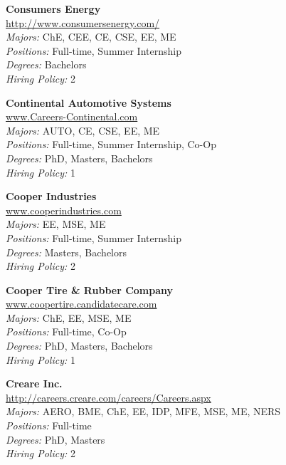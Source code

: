 \documentclass{article}
\begin{document}
\begin{center}
\begin{multicols}{3}
\begin{minipage}{.9\columnwidth}{\Large\bf Consumers Energy }\\
	\url{http://www.consumersenergy.com/}\\
	\emph{Majors:} ChE, CEE, CE, CSE, EE, ME\\
	\emph{Positions:} Full-time, Summer Internship\\
	\emph{Degrees:} Bachelors\\
	\emph{Hiring Policy:} 2\\
\end{minipage}
 
\begin{minipage}{.9\columnwidth}{\Large\bf Continental Automotive Systems }\\
	\url{www.Careers-Continental.com}\\
	\emph{Majors:} AUTO, CE, CSE, EE, ME\\
	\emph{Positions:} Full-time, Summer Internship, Co-Op\\
	\emph{Degrees:} PhD, Masters, Bachelors\\
	\emph{Hiring Policy:} 1\\
\end{minipage}
 
\begin{minipage}{.9\columnwidth}{\Large\bf Cooper Industries }\\
	\url{www.cooperindustries.com}\\
	\emph{Majors:} EE, MSE, ME\\
	\emph{Positions:} Full-time, Summer Internship\\
	\emph{Degrees:} Masters, Bachelors\\
	\emph{Hiring Policy:} 2\\
\end{minipage}
 
\begin{minipage}{.9\columnwidth}{\Large\bf Cooper Tire \& Rubber Company }\\
	\url{www.coopertire.candidatecare.com}\\
	\emph{Majors:} ChE, EE, MSE, ME\\
	\emph{Positions:} Full-time, Co-Op\\
	\emph{Degrees:} PhD, Masters, Bachelors\\
	\emph{Hiring Policy:} 1\\
\end{minipage}
 
\begin{minipage}{.9\columnwidth}{\Large\bf Creare Inc. }\\
	\url{http://careers.creare.com/careers/Careers.aspx}\\
	\emph{Majors:} AERO, BME, ChE, EE, IDP, MFE, MSE, ME, NERS\\
	\emph{Positions:} Full-time\\
	\emph{Degrees:} PhD, Masters\\
	\emph{Hiring Policy:} 2\\
\end{minipage}
 

\end{multicols}
\end{center}
\end{document}
